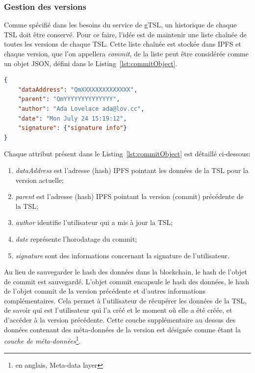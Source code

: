\documentclass{tnreport}
\begin{document}
\subsubsection{Gestion des versions}

Comme spécifié dans les besoins du service de gTSL, un historique de chaque TSL doit être conservé. 
Pour ce faire, l'idée est de maintenir une liste chaînée de toutes les versions de chaque TSL.
Cette liste chaînée est stockée dans IPFS et chaque version, que l'on appellera {\em commit}, de la liste peut être considérée comme un objet JSON, défini dans le Listing~\ref{lst:commitObject}.

\begin{lstlisting}[language=json, basicstyle=\small, caption={Commit Object}, label={lst:commitObject}]
{
	"dataAddress": "QmXXXXXXXXXXXXXX",
	"parent": "QmYYYYYYYYYYYYYY",
	"author": "Ada Lovelace ada@lov.cc",
	"date": "Mon July 24 15:19:12",
	"signature": {"signature info"}
}
\end{lstlisting}

Chaque attribut présent dans le Listing~\ref{lst:commitObject} est détaillé ci-dessous:
\begin{enumerate}
	\item \textit{dataAddress} est l'adresse (hash) IPFS pointant les données de la TSL pour la version actuelle;
	\item \textit{parent} est l'adresse (hash) IPFS pointant la version (commit) précédente de la TSL;
	\item \textit{author} identifie l'utilisateur qui a mis à jour la TSL;
	\item \textit{date} représente l'horodatage du commit;
	\item \textit{signature} sont des informations concernant la signature de l'utilisateur.
\end{enumerate}

Au lieu de sauvegarder le hash des données dans la blockchain, le hash de l'objet de commit est sauvegardé. L'objet commit encapsule le hash des données, le hash de l'objet commit de la version précédente et d'autres informations complémentaires. 
Cela permet à l'utilisateur de récupérer les données de la TSL, de savoir qui est l'utilisateur qui l'a créé et le moment où elle a été créée, et d'accéder à la version précédente. 
Cette couche supplémentaire au dessus des données contenant des méta-données de la version est désignée comme étant la {\em couche de méta-données}\footnote{en anglais, Meta-data layer}.
\end{document}
